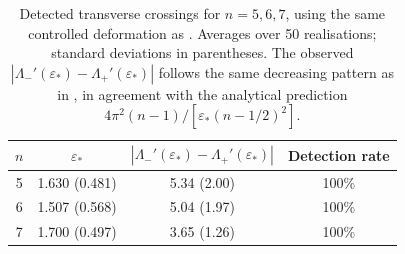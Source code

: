 \begin{table}[htbp]\centering
\caption{Detected transverse crossings for \(n=5,6,7\), using the same
controlled deformation as . Averages over 50
realisations; standard deviations in parentheses. The observed
\(|\Lambda_-'(\varepsilon_*)-\Lambda_+'(\varepsilon_*)|\) follows the same
decreasing pattern as in , in agreement with the
analytical prediction \(4\pi^{2}(n-1)/[\varepsilon_*(n-1/2)^{2}]\).}
\label{tab:high-dim}
\begin{tabular}{cccc}\hline
\(n\) & \(\varepsilon_*\) & \(|\Lambda_-'(\varepsilon_*) - \Lambda_+'(\varepsilon_*)|\) & Detection rate \\\hline
5 & 1.630 (0.481) & 5.34 (2.00) & 100\% \\
6 & 1.507 (0.568) & 5.04 (1.97) & 100\% \\
7 & 1.700 (0.497) & 3.65 (1.26) & 100\% \\
\hline\end{tabular}\end{table}